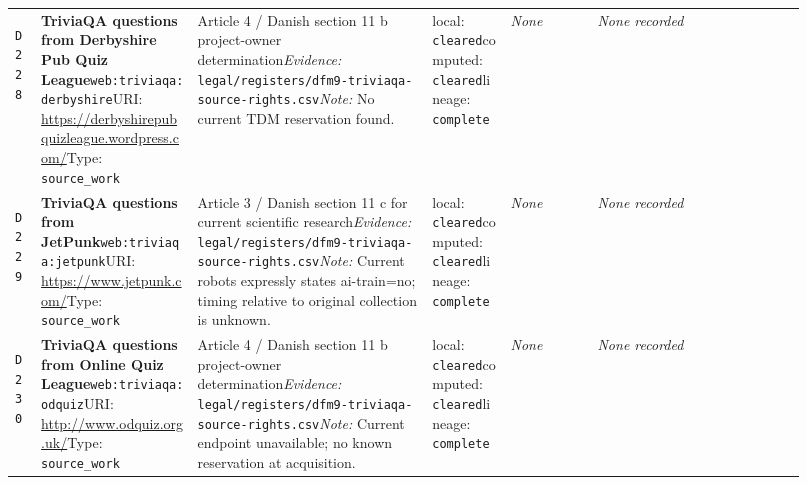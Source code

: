 \documentclass[9pt,a4paper]{article}
\newcommand{\depid}[1]{\hypertarget{dep:#1}{\texttt{#1}}}
\begin{document}
\begin{landscape}
\begin{longtable}{@{}L{0.035\linewidth}L{0.185\linewidth}L{0.27\linewidth}L{0.09\linewidth}L{0.10\linewidth}L{0.24\linewidth}@{}}
\depid{D228} & \textbf{TriviaQA questions from Derbyshire Pub Quiz League}\newline \nolinkurl{web:triviaqa:derbyshire}\newline URI: \url{https://derbyshirepubquizleague.wordpress.com/}\newline Type: \texttt{source\_work} & Article 4 / Danish section 11 b project-owner determination\newline \textit{Evidence:} \nolinkurl{legal/registers/dfm9-triviaqa-source-rights.csv}\newline \textit{Note:} No current TDM reservation found. & local: \texttt{cleared}\newline computed: \texttt{cleared}\newline lineage: \texttt{complete} & \textit{None} & \textit{None recorded} \\
\depid{D229} & \textbf{TriviaQA questions from JetPunk}\newline \nolinkurl{web:triviaqa:jetpunk}\newline URI: \url{https://www.jetpunk.com/}\newline Type: \texttt{source\_work} & Article 3 / Danish section 11 c for current scientific research\newline \textit{Evidence:} \nolinkurl{legal/registers/dfm9-triviaqa-source-rights.csv}\newline \textit{Note:} Current robots expressly states ai-train=no; timing relative to original collection is unknown. & local: \texttt{cleared}\newline computed: \texttt{cleared}\newline lineage: \texttt{complete} & \textit{None} & \textit{None recorded} \\
\depid{D230} & \textbf{TriviaQA questions from Online Quiz League}\newline \nolinkurl{web:triviaqa:odquiz}\newline URI: \url{http://www.odquiz.org.uk/}\newline Type: \texttt{source\_work} & Article 4 / Danish section 11 b project-owner determination\newline \textit{Evidence:} \nolinkurl{legal/registers/dfm9-triviaqa-source-rights.csv}\newline \textit{Note:} Current endpoint unavailable; no known reservation at acquisition. & local: \texttt{cleared}\newline computed: \texttt{cleared}\newline lineage: \texttt{complete} & \textit{None} & \textit{None recorded} \\

\end{longtable}
\end{landscape}
\end{document}
